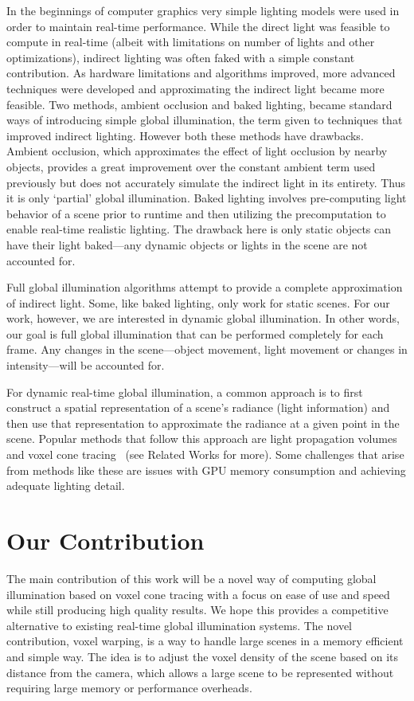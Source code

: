 In the beginnings of computer graphics very simple lighting models were used in order to maintain real-time performance. While the direct light was feasible to compute in real-time (albeit with limitations on number of lights and other optimizations), indirect lighting was often faked with a simple constant contribution. As hardware limitations and algorithms improved, more advanced techniques were developed and approximating the indirect light became more feasible. Two methods, ambient occlusion and baked lighting, became standard ways of introducing simple global illumination, the term given to techniques that improved indirect lighting. However both these methods have drawbacks. Ambient occlusion, which approximates the effect of light occlusion by nearby objects, provides a great improvement over the constant ambient term used previously but does not accurately simulate the indirect light in its entirety. Thus it is only `partial' global illumination. Baked lighting involves pre-computing light behavior of a scene prior to runtime and then utilizing the precomputation to enable real-time realistic lighting. The drawback here is only static objects can have their light baked---any dynamic objects or lights in the scene are not accounted for.

Full global illumination algorithms attempt to provide a complete approximation of indirect light. Some, like baked lighting, only work for static scenes. For our work, however, we are interested in dynamic global illumination. In other words, our goal is full global illumination that can be performed completely for each frame. Any changes in the scene---object movement, light movement or changes in intensity---will be accounted for.

For dynamic real-time global illumination, a common approach is to first construct a spatial representation of a scene's radiance (light information) and then use that representation to approximate the radiance at a given point in the scene. Popular methods that follow this approach are light propagation volumes~\cite{kaplanyan2010cascaded} and voxel cone tracing~\cite{crassin2011interactive} (see Related Works for more). Some challenges that arise from methods like these are issues with GPU memory consumption and achieving adequate lighting detail. %

\section{Our Contribution}
The main contribution of this work will be a novel way of computing global illumination based on voxel cone tracing with a focus on ease of use and speed while still producing high quality results. We hope this provides a competitive alternative to existing real-time global illumination systems. The novel contribution, voxel warping, is a way to handle large scenes in a memory efficient and simple way. The idea is to adjust the voxel density of the scene based on its distance from the camera, which allows a large scene to be represented without requiring large memory or performance overheads.

